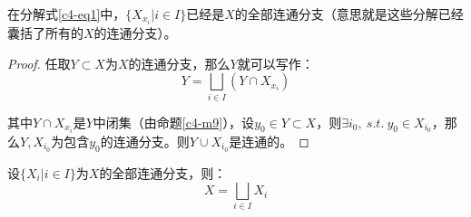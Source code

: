 \documentclass[lang=cn,10pt,device=pad]{elegantbook}
\newcommand{\tl}[1]{\textcolor{myor}{#1}}
\newcommand{\st}{~s.t.~}
\newcommand{\dkh}[1]{\{#1\}}
\begin{document}
\begin{note}
在分解式\ref{c4-eq1}中，$\dkh{X_{x_{i}} |i\in I}$已经是$X$的全部连通分支（\tl{意思就是这些分解已经囊括了所有的$X$的连通分支}）。	
\begin{proof}
	任取$Y\subset X$为$X$的连通分支，那么$Y$就可以写作：
	\begin{equation*}
		Y = \bigsqcup_{i\in I}(Y\cap X_{x_{i}})
	\end{equation*}
	
	其中$Y\cap X_{x_{i}}$是$Y$中闭集（由命题\ref{c4-m9}），设$y_{0}\in Y\subset X$，则$\exists i_{0},\st y_{0}\in X_{i_{0}}$，那么$Y,X_{i_{0}}$为包含$y_{0}$的连通分支。则$Y\cup X_{i_{0}}$是连通的。
\end{proof}
\end{note}
\begin{corollary}[连通分支放在一起就构成了整个集合]
	设$\dkh{X_{i}|i\in I}$为$X$的全部连通分支，则：
	\begin{equation*}
		X = \bigsqcup_{i\in I}X_{i}
	\end{equation*}
\end{corollary}
\end{document}
